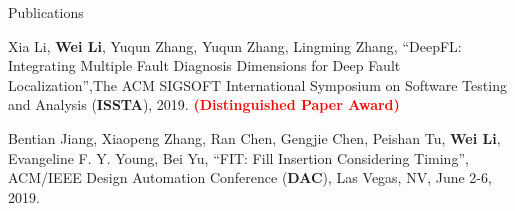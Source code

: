 \begin{rSection}{Publications}
\begin{description}[font=\normalfont]
{}
\item[{[C2]}]{
    Xia Li, \textbf{Wei Li}, Yuqun Zhang, Yuqun Zhang, Lingming Zhang, 
    ``DeepFL: Integrating Multiple Fault Diagnosis Dimensions for Deep Fault Localization'',The ACM SIGSOFT International Symposium on Software Testing and Analysis 
      (\textbf{ISSTA}), 2019. \textcolor{red}{\textbf{(Distinguished Paper Award)}}
}
\item[{[C1]}]{
    Bentian Jiang, Xiaopeng Zhang, Ran Chen, Gengjie Chen, Peishan Tu, \textbf{Wei Li}, Evangeline F. Y. Young, Bei Yu, 
    ``FIT: Fill Insertion Considering Timing'', 
    ACM/IEEE Design Automation Conference (\textbf{DAC}), Las Vegas, NV, June 2-6, 2019.
}


\end{description}


\end{rSection}

